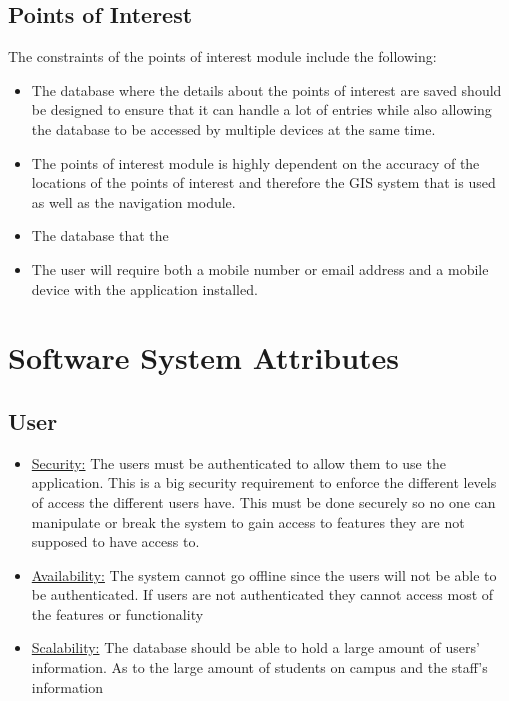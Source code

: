 \documentclass[runningheads,a4paper]{article}
\begin{document}
\subsection{Points of Interest}
The constraints of the points of interest module include the following:

\begin{itemize}
\item The database where the details about the points of interest are saved should be designed to ensure that it can handle a lot of entries while also allowing the database to be accessed by multiple devices at the same time.

\item The points of interest module is highly dependent on the accuracy of the locations of the points of interest and therefore the GIS system that is used as well as the navigation module.

\end{itemize}

\begin{itemize}
\item The database that the 

\item The user will require both a mobile number or email address and a mobile device with the application installed.
\end{itemize}

\section{Software System Attributes}

\subsection{User}
\begin{itemize}
	\item \underline{Security:} The users must be authenticated to allow them to use the application. This is a big security requirement to enforce the different 								levels of access the different users have. This must be done securely so no one can manipulate or break the system to gain 								access to features they are not supposed to have access to.

	\item \underline{Availability:} The system cannot go offline since the users will not be able to be authenticated. If users are not authenticated they cannot 								    access most of the features or functionality
	
	\item \underline {Scalability:} The database should be able to hold a large amount of users' information. As to the large amount of students on campus and 							    the staff's information
\end{itemize}
\end{document}
